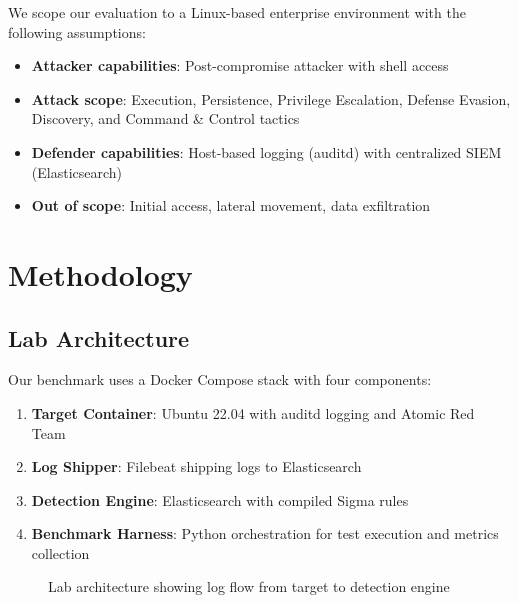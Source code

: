 \documentclass[11pt,a4paper]{article}
\begin{document}
We scope our evaluation to a Linux-based enterprise environment with the following assumptions:

\begin{itemize}
    \item \textbf{Attacker capabilities}: Post-compromise attacker with shell access
    \item \textbf{Attack scope}: Execution, Persistence, Privilege Escalation, Defense Evasion, Discovery, and Command \& Control tactics
    \item \textbf{Defender capabilities}: Host-based logging (auditd) with centralized SIEM (Elasticsearch)
    \item \textbf{Out of scope}: Initial access, lateral movement, data exfiltration
\end{itemize}

\section{Methodology}

\subsection{Lab Architecture}

Our benchmark uses a Docker Compose stack with four components:

\begin{enumerate}
    \item \textbf{Target Container}: Ubuntu 22.04 with auditd logging and Atomic Red Team
    \item \textbf{Log Shipper}: Filebeat shipping logs to Elasticsearch
    \item \textbf{Detection Engine}: Elasticsearch with compiled Sigma rules
    \item \textbf{Benchmark Harness}: Python orchestration for test execution and metrics collection
\end{enumerate}

\begin{figure}[H]
    \centering
    \caption{Lab architecture showing log flow from target to detection engine}
    \label{fig:architecture}
\end{figure}
\end{document}

